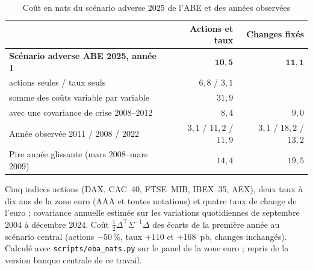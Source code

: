 \begin{table}[p]\centering\small
\caption{Coût en nats du scénario adverse 2025 de l'ABE et des années observées}\label{tab:eba}
\begin{tabular}{@{}lrr@{}}\toprule
& Actions et taux & Changes fixés \\\midrule
\textbf{Scénario adverse ABE 2025, année 1} & $\mathbf{10{,}5}$ & $\mathbf{11{,}1}$ \\
\quad actions seules / taux seuls & $6{,}8$ / $3{,}1$ & \\
\quad somme des coûts variable par variable & $31{,}9$ & \\
\quad avec une covariance de crise 2008--2012 & $8{,}4$ & $9{,}0$ \\\midrule
Année observée 2011 / 2008 / 2022 & $3{,}1$ / $11{,}2$ / $11{,}9$ & $3{,}1$ / $18{,}2$ / $13{,}2$ \\
Pire année glissante (mars 2008--mars 2009) & $14{,}4$ & $19{,}5$ \\
\bottomrule\end{tabular}
\par\medskip\begin{minipage}{0.95\linewidth}\footnotesize
Cinq indices actions (DAX, CAC~40, FTSE~MIB, IBEX~35, AEX), deux taux à dix ans de la zone euro (AAA et toutes notations) et quatre taux de change
de l'euro ; covariance annuelle estimée sur les variations quotidiennes de septembre 2004 à décembre 2024. Coût
$\frac12\Delta^\top\Sigma^{-1}\Delta$ des écarts de la première année au scénario central (actions $-50\,\%$, taux $+110$ et $+168$~pb,
changes inchangés). Calculé avec \texttt{scripts/eba\_nats.py} sur le panel de la zone euro ; repris de la
version banque centrale de ce travail.
\end{minipage}
\end{table}
